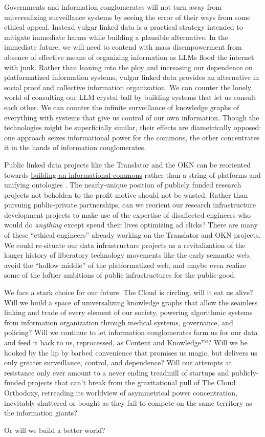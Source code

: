 \documentclass{article}
\begin{document}
Governments and information conglomerates will not turn away from universalizing surveillance systems by seeing the error of their ways from some ethical appeal. Instead vulgar linked data is a practical strategy intended to mitigate immediate harms while building a plausible alternative. In the immediate future, we will need to contend with mass disempowerment from absence of effective means of organizing information as LLMs flood the internet with junk. Rather than leaning into the ploy and increasing our dependence on platformatized information systems, vulgar linked data provides an alternative in social proof and collective information organization. We can counter the lonely world of consulting our LLM crystal ball by building systems that let us consult each other. We can counter the infinite surveillance of knowledge graphs of everything with systems that give us control of our own information. Though the technologies might be superficially similar, their effects are diametrically opposed: one approach seizes informational power for the commons, the other concentrates it in the hands of information conglomerates.

Public linked data projects like the Translator and the OKN can be
reoriented towards
\href{https://jon-e.net/blog/2023/04/24/Re-NIH-RFI-OSTP-Memo/}{building
an informational commons} rather than a string of platforms and unifying
ontologies \cite{saundersReNIHRFI2023} . The nearly-unique
position of publicly funded research projects not beholden to the profit
motive should not be wasted. Rather than pursuing public-private
partnerships, can we reorient our research infrastructure development
projects to make use of the expertise of disaffected engineers who would
do \emph{anything} except spend their lives optimizing ad clicks? There
are many of these ``ethical engineers'' already working on the
Translator and OKN projects. We could re-situate our data infrastructure
projects as a revitalization of the longer history of liberatory
technology movements like the early semantic web, avoid the ``hollow
middle'' of the platformatized web, and maybe even realize some of the
loftier ambitions of public infrastructures for the public good.

We face a stark choice for our future. The Cloud is circling, will it
eat us alive? Will we build a space of universalizing knowledge graphs
that allow the seamless linking and trade of every element of our
society, powering algorithmic systems from information organization
through medical systems, governance, and policing? Will we continue to
let information conglomerates farm us for our data and feed it back to
us, reprocessed, as Content and Knowledge™? Will we be hooked by the lip
by barbed convenience that promises us magic, but delivers us only
greater surveillance, control, and dependence? Will our attempts at
resistance only ever amount to a never ending treadmill of startups and
publicly-funded projects that can't break from the gravitational pull of
The Cloud Orthodoxy, retreading its worldview of asymmetrical power
concentration, inevitably shuttered or bought as they fail to compete on
the same territory as the information giants?

Or will we build a better world?





\end{document}
